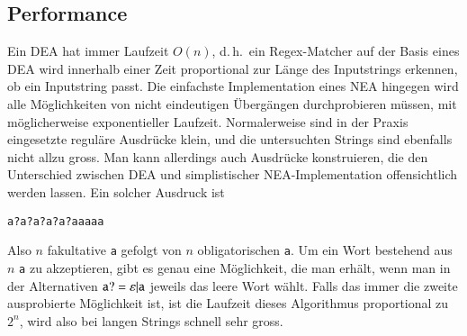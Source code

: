 \subsection{Performance}
%
%
Ein DEA hat immer Laufzeit $O(n)$, d.\,h.~ein Regex-Matcher auf der
Basis eines DEA wird innerhalb einer Zeit proportional zur
Länge des Inputstrings erkennen, ob ein Inputstring passt.
Die einfachste Implementation eines NEA hingegen wird alle Möglichkeiten
von nicht eindeutigen Übergängen durchprobieren müssen, mit
möglicherweise exponentieller Laufzeit.
Normalerweise sind in der
Praxis eingesetzte reguläre Ausdrücke klein, und die untersuchten
Strings sind ebenfalls nicht allzu gross.
Man kann allerdings auch
Ausdrücke konstruieren, die den Unterschied zwischen DEA und simplistischer
NEA-Implementation offensichtlich werden lassen.
Ein solcher Ausdruck ist
\begin{center}
\tt a?a?a?a?a?aaaaa
\end{center}
Also $n$ fakultative {\tt a} gefolgt von $n$ obligatorischen {\tt a}.
Um ein Wort bestehend aus $n$ {\tt a} zu akzeptieren, gibt es genau eine
Möglichkeit, die man erhält, wenn man in der Alternativen
${\tt a?} = \varepsilon|{\tt a}$
jeweils das leere Wort wählt.
Falls das immer die zweite ausprobierte 
Möglichkeit ist, ist die Laufzeit dieses Algorithmus proportional zu
$2^n$, wird also bei langen Strings schnell sehr gross.


